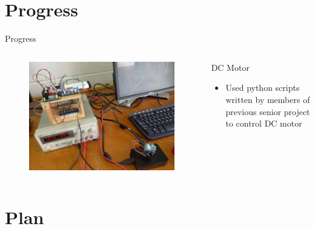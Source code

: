 \documentclass{beamer}
\begin{document}
\section{Progress}

\begin{frame}{Progress}
	\begin{columns}[T]
		\begin{column}{0.5\textwidth}
			\begin{figure}
				\includegraphics[scale=0.04]{../figs/motorSetup.jpg}
			\end{figure}						
		\end{column}
		\begin{column}{0.5\textwidth}
			\begin{block}{DC Motor}
				\begin{itemize}
					\item Used python scripts written by members of previous senior project to control DC motor
				\end{itemize}
			\end{block}
		\end{column}
	\end{columns}
\end{frame}

\section{Plan}
\end{document}
